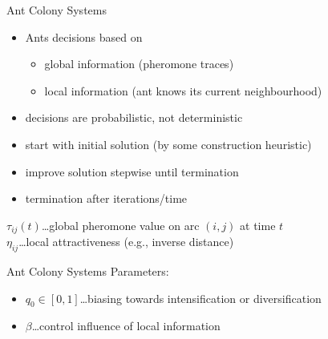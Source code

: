 \documentclass{beamer}
\begin{document}
\begin{frame}{Ant Colony Systems}
  \begin{itemize}
    \item Ants decisions based on 
    \begin{itemize}
      \item global information (pheromone traces)
      \item local information (ant knows its current neighbourhood)
    \end{itemize}
    \item decisions are probabilistic, not deterministic
    \item start with initial solution (by some construction heuristic)
    \item improve solution stepwise until termination
    \item termination after iterations/time
  \end{itemize}

  \begin{Definition}
    $\tau_{ij}(t)$\dots global pheromone value on arc $(i,j)$ at time $t$ \\ 
    $\eta_{ij}$\dots local attractiveness (e.g., inverse distance)
  \end{Definition}

\end{frame}

\begin{frame}{Ant Colony Systems}
  Parameters:
  \begin{itemize}
    \item $q_0 \in [0,1]$\dots biasing towards intensification or diversification
    \item $\beta$\dots control influence of local information
  \end{itemize}
  \vspace{5pt}
\end{frame}
\end{document}
